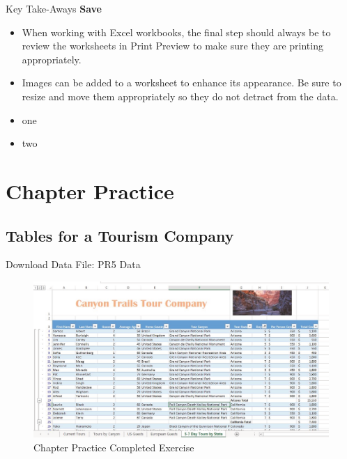 \begin{center}
	\begin{tkwbox}{Key Take-Aways}
		\textbf{Save}
		\\
		\begin{itemize}
			\setlength{\itemsep}{0pt}
			\setlength{\parskip}{0pt}
			\setlength{\parsep}{0pt}

			\item When working with Excel workbooks, the final step should always be to review the worksheets in Print Preview to make sure they are printing appropriately.
			\item Images can be added to a worksheet to enhance its appearance. Be sure to resize and move them appropriately so they do not detract from the data.
			
			\item one
			\item two
			
		\end{itemize}
	\end{tkwbox}
\end{center}


\section{Chapter Practice}




\subsection{Tables for a Tourism Company}

Download Data File: PR5 Data

\begin{figure}[H]
	\centering
	\includegraphics[width=\maxwidth{.95\linewidth}]{gfx/ch05_fig30}
	\caption{Chapter Practice Completed Exercise}
	\label{05:fig30}
\end{figure}






